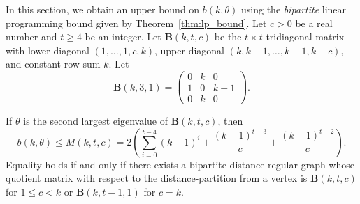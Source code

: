 \documentclass[ALCO,ThmDefs,Unicode,epreuves]{cedram}
\begin{document}
In this section, we obtain an upper bound on $b(k,\theta)$ using the {\em bipartite} linear programming bound given by Theorem~\ref{thm:lp_bound}. Let $c>0$ be a real number and $t\geq 4$ be an integer. Let $\boldsymbol{B}(k,t,c)$ be the $t \times t$ tridiagonal 
matrix 
with lower diagonal $(1,\ldots,1,c,k)$, upper diagonal $(k,k-1,\ldots, k-1,k-c)$, and constant row sum $k$. 
Let
\[
\boldsymbol{B}(k,3,1)=\begin{pmatrix}
0&k&0 \\
1&0&k-1 \\
0&k& 0
\end{pmatrix}.
\]


\begin{theo} \label{bound}
If $\theta$ is the second largest eigenvalue of $\boldsymbol{B}(k,t,c)$, then
\[
b(k,\theta) \leq M(k,t,c)=2\left(\sum_{i=0}^{t-4} (k-1)^{i}+ \frac{(k-1)^{t-3}}{c}+\frac{(k-1)^{t-2}}{c}\right). 
\] 
Equality holds if and only if there exists a bipartite distance-regular graph whose quotient matrix with respect to the distance-partition from a vertex is $\boldsymbol{B}(k,t,c)$ for $1\leq c<k$ or $\boldsymbol{B}(k,t-1,1)$ for $c=k$. 
\end{theo} 
\end{document}
